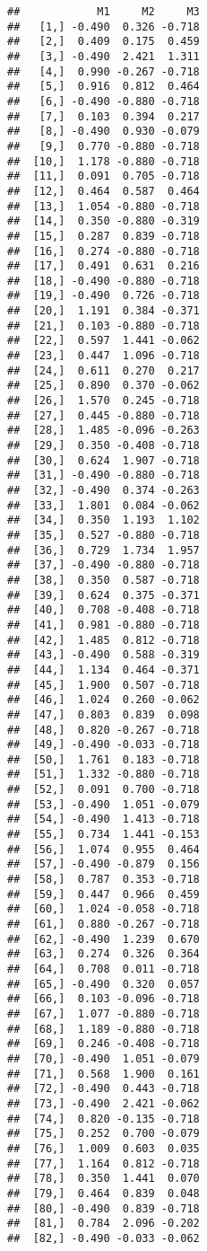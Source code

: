 \documentclass[
]{article}
\begin{document}
\begin{verbatim}
##            M1     M2     M3
##   [1,] -0.490  0.326 -0.718
##   [2,]  0.409  0.175  0.459
##   [3,] -0.490  2.421  1.311
##   [4,]  0.990 -0.267 -0.718
##   [5,]  0.916  0.812  0.464
##   [6,] -0.490 -0.880 -0.718
##   [7,]  0.103  0.394  0.217
##   [8,] -0.490  0.930 -0.079
##   [9,]  0.770 -0.880 -0.718
##  [10,]  1.178 -0.880 -0.718
##  [11,]  0.091  0.705 -0.718
##  [12,]  0.464  0.587  0.464
##  [13,]  1.054 -0.880 -0.718
##  [14,]  0.350 -0.880 -0.319
##  [15,]  0.287  0.839 -0.718
##  [16,]  0.274 -0.880 -0.718
##  [17,]  0.491  0.631  0.216
##  [18,] -0.490 -0.880 -0.718
##  [19,] -0.490  0.726 -0.718
##  [20,]  1.191  0.384 -0.371
##  [21,]  0.103 -0.880 -0.718
##  [22,]  0.597  1.441 -0.062
##  [23,]  0.447  1.096 -0.718
##  [24,]  0.611  0.270  0.217
##  [25,]  0.890  0.370 -0.062
##  [26,]  1.570  0.245 -0.718
##  [27,]  0.445 -0.880 -0.718
##  [28,]  1.485 -0.096 -0.263
##  [29,]  0.350 -0.408 -0.718
##  [30,]  0.624  1.907 -0.718
##  [31,] -0.490 -0.880 -0.718
##  [32,] -0.490  0.374 -0.263
##  [33,]  1.801  0.084 -0.062
##  [34,]  0.350  1.193  1.102
##  [35,]  0.527 -0.880 -0.718
##  [36,]  0.729  1.734  1.957
##  [37,] -0.490 -0.880 -0.718
##  [38,]  0.350  0.587 -0.718
##  [39,]  0.624  0.375 -0.371
##  [40,]  0.708 -0.408 -0.718
##  [41,]  0.981 -0.880 -0.718
##  [42,]  1.485  0.812 -0.718
##  [43,] -0.490  0.588 -0.319
##  [44,]  1.134  0.464 -0.371
##  [45,]  1.900  0.507 -0.718
##  [46,]  1.024  0.260 -0.062
##  [47,]  0.803  0.839  0.098
##  [48,]  0.820 -0.267 -0.718
##  [49,] -0.490 -0.033 -0.718
##  [50,]  1.761  0.183 -0.718
##  [51,]  1.332 -0.880 -0.718
##  [52,]  0.091  0.700 -0.718
##  [53,] -0.490  1.051 -0.079
##  [54,] -0.490  1.413 -0.718
##  [55,]  0.734  1.441 -0.153
##  [56,]  1.074  0.955  0.464
##  [57,] -0.490 -0.879  0.156
##  [58,]  0.787  0.353 -0.718
##  [59,]  0.447  0.966  0.459
##  [60,]  1.024 -0.058 -0.718
##  [61,]  0.880 -0.267 -0.718
##  [62,] -0.490  1.239  0.670
##  [63,]  0.274  0.326  0.364
##  [64,]  0.708  0.011 -0.718
##  [65,] -0.490  0.320  0.057
##  [66,]  0.103 -0.096 -0.718
##  [67,]  1.077 -0.880 -0.718
##  [68,]  1.189 -0.880 -0.718
##  [69,]  0.246 -0.408 -0.718
##  [70,] -0.490  1.051 -0.079
##  [71,]  0.568  1.900  0.161
##  [72,] -0.490  0.443 -0.718
##  [73,] -0.490  2.421 -0.062
##  [74,]  0.820 -0.135 -0.718
##  [75,]  0.252  0.700 -0.079
##  [76,]  1.009  0.603  0.035
##  [77,]  1.164  0.812 -0.718
##  [78,]  0.350  1.441  0.070
##  [79,]  0.464  0.839  0.048
##  [80,] -0.490  0.839 -0.718
##  [81,]  0.784  2.096 -0.202
##  [82,] -0.490 -0.033 -0.062

\end{verbatim}
\end{document}
